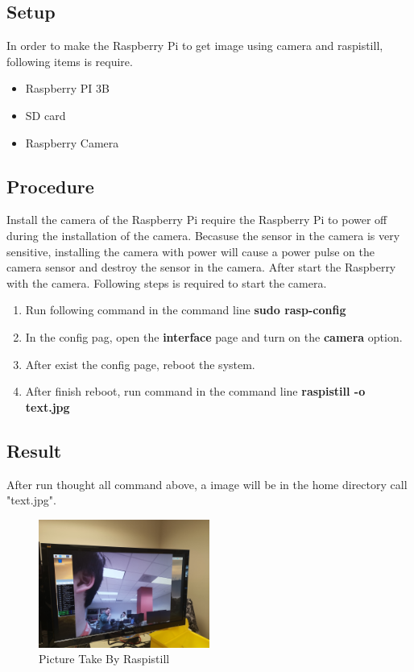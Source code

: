 \documentclass{article}
\begin{document}
\subsection{Setup}
In order to make the Raspberry Pi to get image using camera and raspistill, following items is require.
\begin{itemize}
	\item Raspberry PI 3B
	\item SD card
	\item Raspberry Camera
\end{itemize}
\subsection{Procedure}
Install the camera of the Raspberry Pi require the Raspberry Pi to power off during the installation of the camera. Becasuse the sensor in the camera is very sensitive, installing the camera with power will cause a power pulse on the camera sensor and destroy the sensor in the camera. After start the Raspberry with the camera. Following steps is required to start the camera.
\begin{enumerate}
	\item Run following command in the command line \textbf{sudo rasp-config}
	\item In the config pag, open the \textbf{interface} page and turn on the \textbf{camera} option.
	\item After exist the config page, reboot the system.
	\item After finish reboot, run command in the command line \textbf{raspistill -o text.jpg}
\end{enumerate}
\subsection{Result}
After run thought all command above, a image will be in the home directory call "text.jpg".
\begin{figure}[hb]
	\centering
	\includegraphics[width=0.5\textwidth]{img/Lab03_14.jpg}
	\caption{Picture Take By Raspistill} 
	\label{BBD}
\end{figure}
\clearpage
\end{document}
